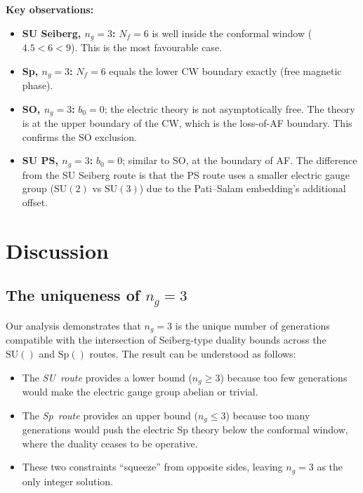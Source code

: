 \documentclass[11pt,a4paper]{article}
\theoremstyle{plain}
\theoremstyle{definition}
\theoremstyle{remark}
\newcommand{\Nf}{N_{\!f}}
\newcommand{\ngen}{n_g}
\newcommand{\SU}[1]{\mathrm{SU}(#1)}
\newcommand{\Sp}[1]{\mathrm{Sp}(#1)}
\begin{document}
\textbf{Key observations:}
\begin{itemize}
  \item \textbf{SU Seiberg, $\ngen = 3$:} $\Nf = 6$ is well inside the
    conformal window ($4.5 < 6 < 9$).  This is the most favourable case.
  \item \textbf{Sp, $\ngen = 3$:} $\Nf = 6$ equals the lower CW boundary
    exactly (free magnetic phase).
  \item \textbf{SO, $\ngen = 3$:} $b_0 = 0$; the electric theory is not
    asymptotically free.  The theory is at the upper boundary of the
    CW, which is the loss-of-AF boundary.  This confirms the SO
    exclusion.
  \item \textbf{SU PS, $\ngen = 3$:} $b_0 = 0$; similar to SO, at the
    boundary of AF.  The difference from the SU Seiberg route is that
    the PS route uses a smaller electric gauge group ($\SU{2}$ vs
    $\SU{3}$) due to the Pati--Salam embedding's additional offset.
\end{itemize}


\section{Discussion}
\label{sec:discussion}

\subsection{The uniqueness of $\ngen = 3$}

Our analysis demonstrates that $\ngen = 3$ is the unique number of
generations compatible with the intersection of Seiberg-type duality
bounds across the $\SU{}$ and $\Sp{}$ routes.  The result can be
understood as follows:
\begin{itemize}
  \item The \emph{SU~route} provides a lower bound ($\ngen \geq 3$) because
    too few generations would make the electric gauge group abelian or
    trivial.
  \item The \emph{Sp~route} provides an upper bound ($\ngen \leq 3$)
    because too many generations would push the electric Sp theory below
    the conformal window, where the duality ceases to be operative.
  \item These two constraints ``squeeze'' from opposite sides, leaving
    $\ngen = 3$ as the only integer solution.
\end{itemize}
\end{document}
